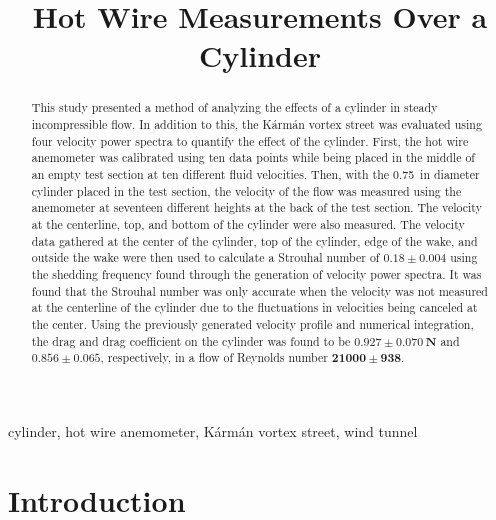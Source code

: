 \documentclass[journal,letterpaper]{IEEEtran}
\begin{document}
\title{Hot Wire Measurements Over a Cylinder}

\author{
}

\maketitle
\thispagestyle{empty}

\begin{abstract}
This study presented a method of analyzing the effects of a cylinder in steady incompressible flow.
In addition to this, the Kármán vortex street was evaluated using four velocity power spectra to quantify the effect of the cylinder.
First, the hot wire anemometer was calibrated using ten data points while being placed in the middle of an empty test section at ten different fluid velocities.
Then, with the \qty{0.75}{in} diameter cylinder placed in the test section, the velocity of the flow was measured using the anemometer at seventeen different heights at the back of the test section.
The velocity at the centerline, top, and bottom of the cylinder were also measured.
The velocity data gathered at the center of the cylinder, top of the cylinder, edge of the wake, and outside the wake were then used to calculate a Strouhal number of $\bm{0.18 \pm 0.004}$ using the shedding frequency found through the generation of velocity power spectra.
It was found that the Strouhal number was only accurate when the velocity was not measured at the centerline of the cylinder due to the fluctuations in velocities being canceled at the center.
Using the previously generated velocity profile and numerical integration, the drag and drag coefficient on the cylinder was found to be $\bm{0.927 \pm }\mathbf{\qty{0.070}{\newton}}$ and $\bm{0.856 \pm 0.065}$, respectively, in a flow of Reynolds number $\bm{21000 \pm 938}$.
\end{abstract}

\begin{IEEEkeywords}
cylinder, hot wire anemometer, Kármán vortex street, wind tunnel
\end{IEEEkeywords}


\section{Introduction}
\end{document}
